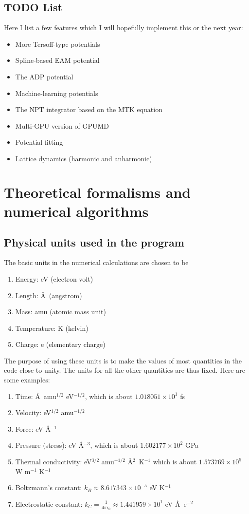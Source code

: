 \documentclass[12pt,a4paper]{report}
\begin{document}
\section{TODO List}

Here I list a few features which I will hopefully implement this or the next year:
\begin{itemize}
\item More Tersoff-type potentials
\item Spline-based EAM potential
\item The ADP potential
\item Machine-learning potentials
\item The NPT integrator based on the MTK equation
\item Multi-GPU version of GPUMD
\item Potential fitting
\item Lattice dynamics (harmonic and anharmonic)
\end{itemize}


\chapter{Theoretical formalisms and numerical algorithms}

\section{Physical units used in the program}

The basic units in the numerical calculations are chosen to be
\begin{enumerate}
\item Energy: eV (electron volt)
\item Length: \AA~(angstrom)
\item Mass: amu (atomic mass unit)
\item Temperature: K (kelvin)
\item Charge: e (elementary charge)
\end{enumerate}
The purpose of using these units is to make the values of most quantities in the code close to unity. The units for all the other quantities are thus fixed. Here are some examples:
\begin{enumerate}
\item Time: \AA~amu$^{1/2}$ eV$^{-1/2}$, which is about $1.018051 \times 10^{1}$ fs
\item Velocity: eV$^{1/2}$ amu$^{-1/2}$
\item Force: eV \AA$^{-1}$
\item Pressure (stress): eV \AA$^{-3}$, which is about $1.602177 \times 10^{2}$ GPa
\item Thermal conductivity: eV$^{3/2}$ amu$^{-1/2}$ \AA$^{2}$~K$^{-1}$
      which is about $1.573769 \times 10^{5}$ W m$^{-1}$ K$^{-1}$
\item Boltzmann's constant: $k_B \approx 8.617343 \times 10^{-5}$ eV K$^{-1}$
\item Electrostatic constant:
$k_C = \frac{1}{4\pi\epsilon_0} \approx 1.441959 \times 10^{1}$ eV \AA~e$^{-2}$
\end{enumerate}
\end{document}
